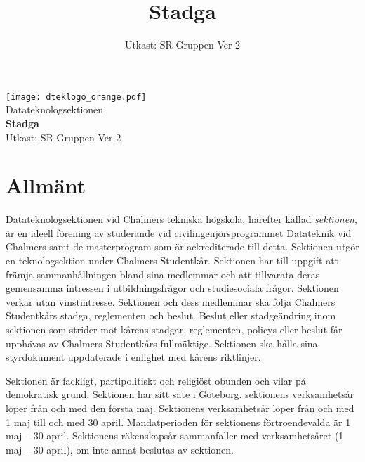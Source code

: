 \documentclass[a4paper]{dtek}
\title{Stadga}
\date{Utkast: SR-Gruppen Ver 2}
\begin{document}
\begin{titlepage}
  \thispagestyle{empty} %
  \vspace*{\fill}
  \begin{center}
    \texttt{[image: dteklogo\_orange.pdf]}\\[3em]
    {\Huge Datateknologsektionen}\\[3em]
    {\Huge \textbf{Stadga}}\\[1em]
    Utkast: SR-Gruppen Ver 2\\[20em]
  \end{center}
  \vspace*{\fill}
\end{titlepage}

\makeheadfoot

\setcounter{tocdepth}{2}
\tableofcontents

\section{Allmänt}
\para[Ändamål] Datateknologsektionen vid Chalmers tekniska högskola, härefter kallad \textit{sektionen}, är en ideell förening av studerande vid civilingenjörsprogrammet Datateknik vid Chalmers samt de masterprogram som är ackrediterade till detta. Sektionen utgör en teknologsektion under Chalmers Studentkår. 
\para Sektionen har till uppgift att främja sammanhållningen bland sina medlemmar och att tillvarata deras gemensamma intressen i utbildningsfrågor och studiesociala frågor. Sektionen verkar utan vinstintresse.
\para Sektionen och dess medlemmar ska följa Chalmers Studentkårs stadga, reglementen och beslut. Beslut eller stadgeändring inom sektionen som strider mot kårens stadgar, reglementen, policys eller beslut får upphävas av Chalmers Studentkårs fullmäktige. Sektionen ska hålla sina styrdokument uppdaterade i enlighet med kårens riktlinjer. 

\para Sektionen är fackligt, partipolitiskt och religiöst obunden och vilar på demokratisk grund.
\para Sektionen har sitt säte i Göteborg.
\para[Verksamhetsår]
sektionens verksamhetsår löper från och med den första maj.
\para Sektionens verksamhetsår löper från och med 1 maj till och med 30 april. Mandatperioden för sektionens förtroendevalda är 1 maj – 30 april.
\para[Räkenskapsår]
Sektionens räkenskapsår sammanfaller med verksamhetsåret (1 maj – 30 april), om inte annat beslutas av sektionen.
\end{document}
